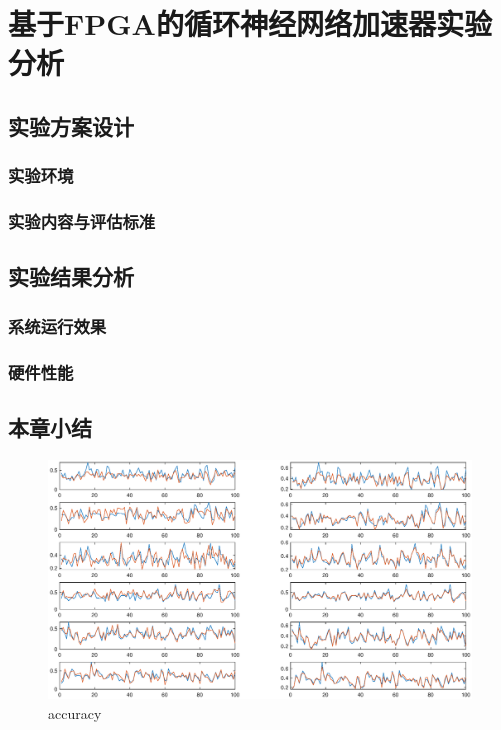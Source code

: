 \chapter{基于FPGA的循环神经网络加速器实验分析}
\section{实验方案设计}

\subsection{实验环境}
\subsection{实验内容与评估标准}

\section{实验结果分析}

\subsection{系统运行效果}

\subsection{硬件性能}

\section{本章小结}

\begin{figure}
	\centering
	\includegraphics[width=1.0\columnwidth]{exp/fig_accuracy.eps}
	\caption{accuracy}
	\label{fig_accuracy}
\end{figure}


